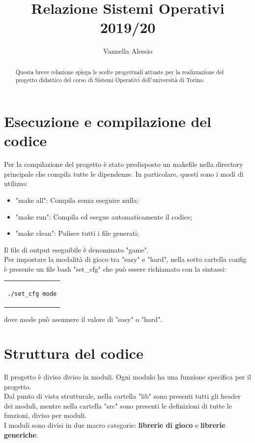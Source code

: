 \documentclass{article}
\title{Relazione Sistemi Operativi 2019/20}
\author{Vannella Alessio}
\date{}
\begin{document}
\maketitle
\tableofcontents
\begin{abstract}
Questa breve relazione spiega le scelte progettuali attuate per la realizzazione del progetto didattico del corso di Sistemi Operativi dell'università di Torino. 
\end{abstract}
\section{Esecuzione e compilazione del codice} 
Per la compilazione del progetto è stato predisposto un makefile nella directory principale che compila tutte le dipendenze. In particolare, questi sono i modi di utilizzo: 
\begin{itemize}
    \item "make all": Compila senza eseguire nulla; 
    \item "make run": Compila ed esegue automaticamente il codice;
    \item "make clean": Pulisce tutti i file generati;
\end{itemize}
Il file di output eseguibile è denominato "game".\\Per impostare la modalità di gioco tra "easy" e "hard", nella sotto cartella config è presente un file bash "set\_cfg" che può essere richiamato con la sintassi:\\ 
\begin{center}
\begin{tabular}{c}
\begin{lstlisting}
./set_cfg mode
\end{lstlisting}
\end{tabular}
\end{center}

dove mode può assumere il valore di "easy" o "hard".




\section{Struttura del codice}
Il progetto è diviso diviso in moduli. Ogni modulo ha una funzione specifica per il progetto.\\Dal punto di vista strutturale, nella cartella "lib" sono presenti tutti gli header dei moduli, mentre nella cartella "src" sono presenti le definizioni di tutte le funzioni, diviso per moduli.\\I moduli sono divisi in due macro categorie: \textbf{librerie di gioco} e \textbf{librerie generiche}.
\end{document}

